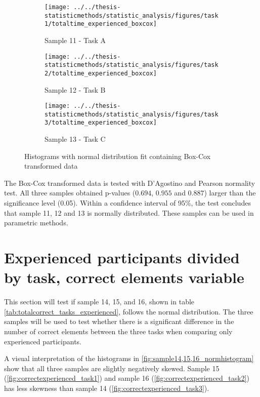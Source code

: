 \begin{appendices}
\begin{figure}[H]
	\centering
	\begin{subfigure}[b]{0.32\textwidth}
		\centering
		\texttt{[image: ../../thesis-statisticmethods/statistic\_analysis/figures/task1/totaltime\_experienced\_boxcox]}
		\caption{Sample 11 - Task A}
		\label{fig:totaltimeexperiencedboxcox_task1}
	\end{subfigure}
	\begin{subfigure}[b]{0.32\textwidth}
		\centering
		\texttt{[image: ../../thesis-statisticmethods/statistic\_analysis/figures/task2/totaltime\_experienced\_boxcox]}
		\caption{Sample 12 - Task B}
		\label{fig:totaltimeexperiencedboxcox_task2}
	\end{subfigure}
	\begin{subfigure}[b]{0.32\textwidth}
		\centering
		\texttt{[image: ../../thesis-statisticmethods/statistic\_analysis/figures/task3/totaltime\_experienced\_boxcox]}
		\caption{Sample 13 - Task C}
		\label{fig:totaltimeexperiencedboxcox_task3}
	\end{subfigure}
	\caption{Histograms with normal distribution fit containing Box-Cox transformed data}
	\label{fig:sample11_12_13_boxcox_histogram}
\end{figure}

The Box-Cox transformed data is tested with D'Agostino and Pearson normality test. All three samples obtained p-values ($0.694$, $0.955$ and $0.887$) larger than the significance level (0.05). Within a confidence interval of 95\%, the test concludes that sample 11, 12 and 13 is normally distributed. These samples can be used in parametric methods.

\section{Experienced participants divided by task, correct elements variable}\label{app:norm_14_15_16}

This section will test if sample 14, 15, and 16, shown in table \ref{tab:totalcorrect_tasks_experienced}, follows the normal distribution. The three samples will be used to test whether there is a significant difference in the number of correct elements between the three tasks when comparing only experienced participants. 

A visual interpretation of the histograms in \ref{fig:sample14,15,16_normhistogram} show that all three samples are slightly negatively skewed. Sample 15 (\ref{fig:correctexperienced_task1}) and sample 16 (\ref{fig:correctexperienced_task2}) has less skewness than sample 14 (\ref{fig:correctexperienced_task3}).   


\end{appendices}
